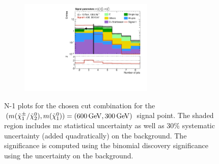 \begin{figure}
\begin{subfigure}[b]{0.5\linewidth}
		\caption{}
	\end{subfigure}\hfill
	\begin{subfigure}[b]{0.5\linewidth}
		\centering\includegraphics[width=0.7\textwidth]{N-1_cut_scan/n1_600_300/nJet30}
		\caption{}
	\end{subfigure}

	\caption[N-1 plots for the chosen cut combination for the (600, 300) signal point]{N-1 plots for the chosen cut combination for the $(m(\charg/\neutr), m(\lsp)) = (\SI{600}{\GeV}, \SI{300}{\GeV})$ signal point. The shaded region includes \gls{mc} statistical uncertainty as well as 30\% systematic uncertainty (added quadratically) on the background. The significance is computed using the binomial discovery significance using the uncertainty on the background.}
	\label{fig:results_n1_600_300}
\end{figure}

